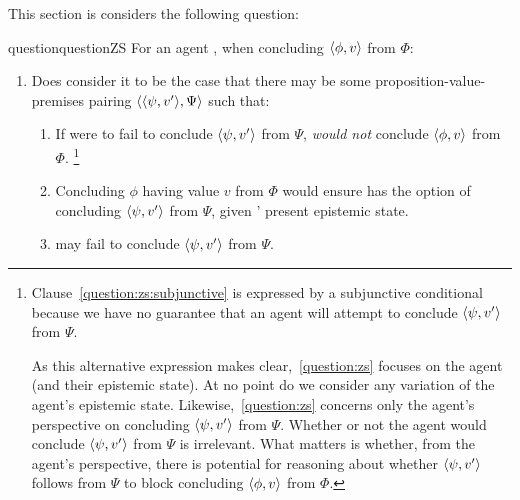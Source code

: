 \begin{note}
  This section is considers the following question:

  \begin{restatable}[\qzS{}]{question}{questionZS}
    \label{question:zs}
    For an agent \vAgent{}, when concluding \(\langle \phi, v \rangle\) from \(\Phi\):

      \begin{enumerate}[label=\arabic*., ref=(\arabic*)]
      \item
        Does \vAgent{} consider it to be the case that there may be some proposition-value-premises pairing \(\langle \langle \psi, v' \rangle, \Psi \rangle\) such that:
        \begin{enumerate}[label=\alph*., ref=(\alph*)]
        \item
          \label{question:zs:subjunctive}
          If \vAgent{} were to fail to conclude \(\langle \psi, v' \rangle\) from \(\Psi\), \vAgent{} \emph{would not} conclude \(\langle \phi, v \rangle\) from \(\Phi\).%
          \footnote{
            Clause~\ref{question:zs:subjunctive} is expressed by a subjunctive conditional because we have no guarantee that an agent will attempt to conclude \(\langle \psi, v' \rangle\) from \(\Psi\).

            \color{red}
            As this alternative expression makes clear,~\autoref{question:zs} focuses on the agent (and their epistemic state).
            At no point do we consider any variation of the agent's epistemic state.
            Likewise,~\autoref{question:zs} concerns only the agent's perspective on concluding \(\langle \psi, v' \rangle\) from \(\Psi\).
            Whether or not the agent would conclude \(\langle \psi, v' \rangle\) from \(\Psi\) is irrelevant.
            What matters is whether, from the agent's perspective, there is potential for reasoning about whether \(\langle \psi, v' \rangle\) follows from \(\Psi\) to block concluding \(\langle \phi, v \rangle\) from \(\Phi\).
          }
        \item
          \label{question:zs:option}
          Concluding \(\phi\) having value \(v\) from \(\Phi\) would ensure \vAgent{} has the option of concluding \(\langle \psi, v' \rangle\) from \(\Psi\), given \vAgent{}' present epistemic state.
        \item
          \label{question:zs:may-fail}
          \vAgent{} may fail to conclude \(\langle \psi, v' \rangle\) from \(\Psi\).
        \end{enumerate}
      \end{enumerate}
    \vspace{-\baselineskip}
  \end{restatable}


\end{note}
